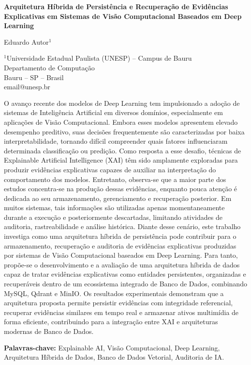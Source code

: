 \documentclass[12pt,a4paper,twoside]{article}
\newcommand{\articleTitle}{Arquitetura Híbrida de Persistência e Recuperação de Evidências Explicativas em Sistemas de Visão Computacional Baseados em Deep Learning}
\begin{document}
\onehalfspacing

\begin{center}
    {\Large \textbf{\articleTitle}}

    \vspace{0.5cm}

    Eduardo Autor$^{1}$

    \vspace{0.3cm}

    $^{1}$Universidade Estadual Paulista (UNESP) -- Campus de Bauru\\
    Departamento de Computação\\
    Bauru -- SP -- Brasil\\
    email@unesp.br
\end{center}

\begin{resumo}
O avanço recente dos modelos de Deep Learning tem impulsionado a adoção de sistemas de Inteligência Artificial em diversos domínios, especialmente em aplicações de Visão Computacional. Embora esses modelos apresentem elevado desempenho preditivo, suas decisões frequentemente são caracterizadas por baixa interpretabilidade, tornando difícil compreender quais fatores influenciaram determinada classificação ou predição. Como resposta a esse desafio, técnicas de Explainable Artificial Intelligence (XAI) têm sido amplamente exploradas para produzir evidências explicativas capazes de auxiliar na interpretação do comportamento dos modelos. Entretanto, observa-se que a maior parte dos estudos concentra-se na produção dessas evidências, enquanto pouca atenção é dedicada ao seu armazenamento, gerenciamento e recuperação posterior. Em muitos sistemas, tais informações são utilizadas apenas momentaneamente durante a execução e posteriormente descartadas, limitando atividades de auditoria, rastreabilidade e análise histórica. Diante desse cenário, este trabalho investiga como uma arquitetura híbrida de persistência pode contribuir para o armazenamento, recuperação e auditoria de evidências explicativas produzidas por sistemas de Visão Computacional baseados em Deep Learning. Para tanto, propõe-se o desenvolvimento e a avaliação de uma arquitetura híbrida de dados capaz de tratar evidências explicativas como entidades persistentes, organizadas e recuperáveis dentro de um ecossistema integrado de Banco de Dados, combinando MySQL, Qdrant e MinIO. Os resultados experimentais demonstram que a arquitetura proposta permite persistir evidências com integridade referencial, recuperar evidências similares em tempo real e armazenar ativos multimídia de forma eficiente, contribuindo para a integração entre XAI e arquiteturas modernas de Banco de Dados.

\vspace{\onelineskip}
\noindent
\textbf{Palavras-chave:} Explainable AI, Visão Computacional, Deep Learning, Arquitetura Híbrida de Dados, Banco de Dados Vetorial, Auditoria de IA.
\end{resumo}
\end{document}
